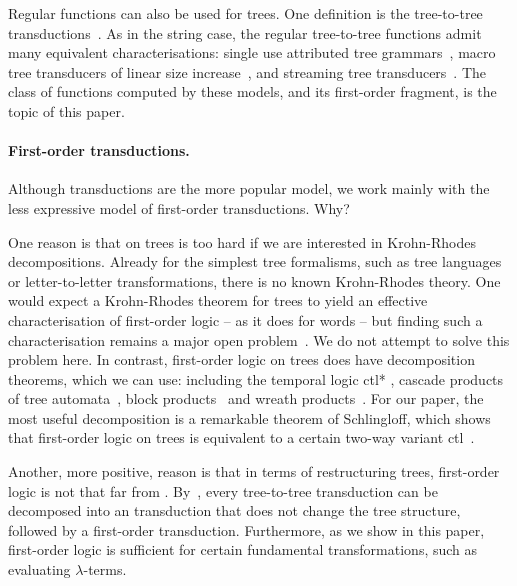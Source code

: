 Regular functions can also be used for trees. One definition  is the \mso tree-to-tree transductions~\cite[Section 3]{bloem_comparison_2000}. As in the string case, the regular tree-to-tree functions admit many equivalent characterisations: single use attributed tree grammars~\cite{bloem_comparison_2000}, macro tree transducers of linear size increase~\cite[Theorem 7.1]{engelfriet_macro_2003}, and streaming tree transducers~\cite[Theorem 4.6]{alur2017streaming}. The class of functions computed by these models, and its first-order fragment, is the topic of this paper. 

\paragraph*{First-order transductions. } Although \mso transductions are the more popular model, we work mainly with the less expressive model of first-order transductions. Why?

One reason is that \mso on trees is too hard if we are interested in Krohn-Rhodes decompositions.  Already for the simplest tree formalisms, such as tree languages or letter-to-letter transformations, there is no known  Krohn-Rhodes theory. One would expect a Krohn-Rhodes theorem  for trees to yield an effective characterisation of first-order logic -- as it does for words -- but finding such a characterisation remains a major open problem~\cite[Section 3]{bojanczyk2015automata}. We do not attempt to solve this problem here. In contrast, first-order logic on trees does have decomposition theorems, which we can use: including the temporal logic {\sc ctl*} \cite[Main Theorem]{haferthomas}, cascade products of tree automata~\cite[Theorem 2.5.7]{bojanczykDecidablePropertiesTree2004}, block products~\cite[Corollary 3.11]{esik2010algebraic} and wreath products~\cite[Theorem 3.1]{bojanczykWreathProductsForest2012}. For our paper, the most useful decomposition is a remarkable theorem of Schlingloff, which shows that first-order logic on trees is equivalent to a certain two-way variant  {\sc ctl}~\cite[Theorem 4.5]{schlingloff1992expressive}.

Another, more positive, reason is that in terms of restructuring trees, first-order logic is not that far from \mso.  By~\cite[Corollary 1]{colcombetCombinatorialTheoremTrees2007},  every \mso tree-to-tree transduction can be decomposed into an \mso transduction that does not change the tree structure, followed by a first-order transduction. Furthermore, as we show in this paper, first-order logic is sufficient for certain fundamental transformations, such as evaluating $\lambda$-terms. 


